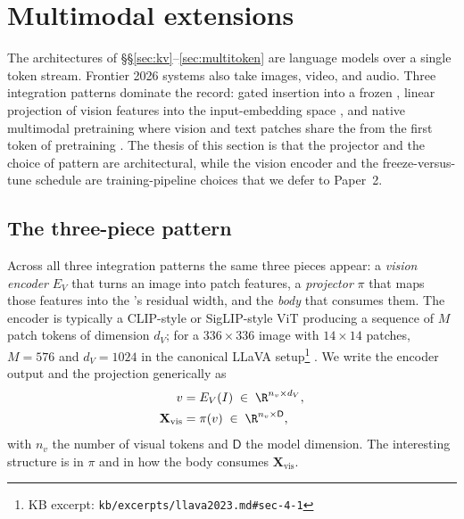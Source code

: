 
\section{Multimodal extensions}
\label{sec:multimodal}
\label{sec:multimodal-extensions}

The architectures of \S\S\ref{sec:kv}--\ref{sec:multitoken} are 
language models over a single token stream. Frontier 2026 systems also
take images, video, and audio. Three integration patterns dominate the
record: gated  insertion into a frozen 
\citep{alayrac2022-flamingo}, linear projection of vision features into
the  input-embedding space \citep{llava2023}, and native multimodal
pretraining where vision and text patches share the 
from the first token of pretraining
\citep{meta-llama4,internvl3-2025,gemini2-5}. The thesis of this
section is that the projector and the choice of pattern are
architectural, while the vision encoder and the
freeze-versus-tune schedule are training-pipeline choices that we
defer to Paper~2.

\subsection{The three-piece pattern}
\label{sec:multimodal-three-piece}

Across all three integration patterns the same three pieces appear: a
\emph{vision encoder} $E_V$ that turns an image into patch features, a
\emph{projector} $\pi$ that maps those features into the 's residual
width, and the \emph{ body} that consumes them. The encoder is
typically a CLIP-style or SigLIP-style ViT producing a sequence of
$M$ patch tokens of dimension $d_V$; for a $336{\times}336$ image with
$14{\times}14$ patches, $M{=}576$ and $d_V{=}1024$ in the canonical
LLaVA setup\footnote{KB excerpt: \nolinkurl{kb/excerpts/llava2023.md#sec-4-1}}
\citep{llava2023}. We write the encoder output and the projection
generically as
\begin{align}
v &= E_V(I) \;\in\; \R^{n_v \times d_V}, \label{eq:multimodal-encoder}\\
\mathbf{X}_{\text{vis}} &= \pi(v) \;\in\; \R^{n_v \times \mathsf{D}}, \label{eq:multimodal-projector}
\end{align}
with $n_v$ the number of visual tokens and $\mathsf{D}$ the  model
dimension. The interesting structure is in $\pi$ and in how the body
consumes $\mathbf{X}_{\text{vis}}$.

